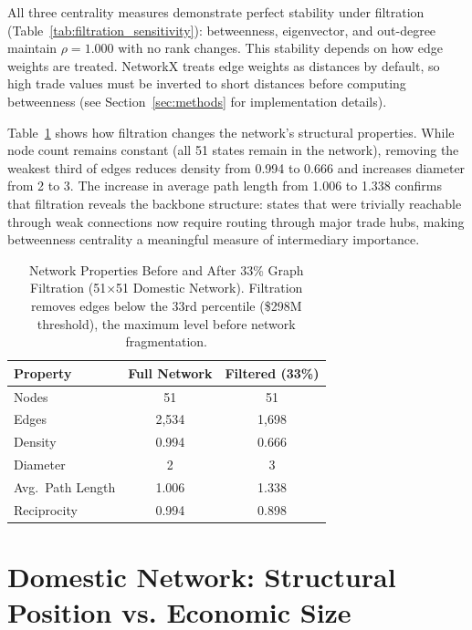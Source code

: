 \documentclass[12pt,oneside]{book}
\begin{document}
All three centrality measures demonstrate perfect stability under filtration (Table~\ref{tab:filtration_sensitivity}): betweenness, eigenvector, and out-degree maintain $\rho = 1.000$ with no rank changes. This stability depends on how edge weights are treated. 
NetworkX treats edge weights as distances by default, so high trade values must be inverted to short distances before computing betweenness (see Section~\ref{sec:methods} for implementation details).

Table~\ref{tab:filtration_properties} shows how filtration changes the network's structural properties. While node count remains constant (all 51 states remain in the network), removing the weakest third of edges reduces density from 0.994 to 0.666 and increases diameter from 2 to 3. The increase in average path length from 1.006 to 1.338 confirms that filtration reveals the backbone structure: states that were trivially reachable through weak connections now require routing through major trade hubs, making betweenness centrality a meaningful measure of intermediary importance.  

\begin{table}[ht]
  \centering
  \caption[Network Properties Before and After 33\% Graph Filtration (51$\times$51 Domestic Network).]{Network Properties Before and After 33\% Graph Filtration (51$\times$51 Domestic Network). Filtration removes edges below the 33rd percentile (\$298M threshold), the maximum level before network fragmentation.}
  \label{tab:filtration_properties}
  \begin{tabular}{lcc}
  \hline
  \textbf{Property} & \textbf{Full Network} & \textbf{Filtered (33\%)} \\
  \hline
  Nodes & 51 & 51 \\
  Edges & 2,534 & 1,698 \\
  Density & 0.994 & 0.666 \\
  Diameter & 2 & 3 \\
  Avg.\ Path Length & 1.006 & 1.338 \\
  Reciprocity & 0.994 & 0.898 \\
  \hline
  \end{tabular}
\end{table}


\section{Domestic Network: Structural Position vs. Economic Size}
\label{sec:domestic}
\end{document}

